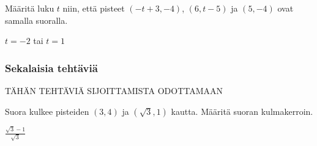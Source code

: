 \begin{tehtavasivu}
\begin{tehtava}
Määritä luku $t$ niin, että pisteet $(-t+3,-4)$, $(6,t-5)$ ja $(5,-4)$ ovat samalla suoralla.
\begin{vastaus}
$t=-2$ tai $t=1$
\end{vastaus}
\end{tehtava}

\subsubsection*{Sekalaisia tehtäviä}

TÄHÄN TEHTÄVIÄ SIJOITTAMISTA ODOTTAMAAN

\begin {tehtava}
Suora kulkee pisteiden $(3,4)$ ja $(\sqrt{3},1)$ kautta. Määritä suoran kulmakerroin.
\begin {vastaus}
$\frac{\sqrt{3}-1}{\sqrt{3}}$
\end {vastaus}
\end {tehtava}

\end{tehtavasivu}
